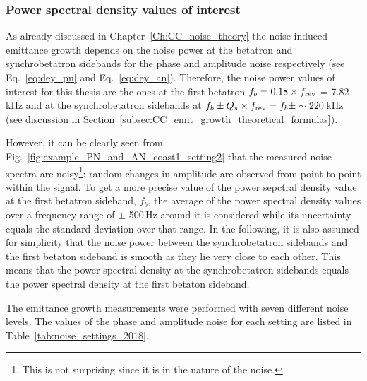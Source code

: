 \subsubsection*{Power spectral density values of interest}
As already discussed in Chapter~\ref{Ch:CC_noise_theory} the noise induced emittance growth depends on the noise power at the betatron and synchrobetatron sidebands for the phase and amplitude noise respectively (see Eq.~\eqref{eq:dey_pn} and Eq.~\eqref{eq:dey_an}). Therefore, the noise power values of interest for this thesis are the ones at the first betatron $f_b = 0.18 \times {f_\mathrm{rev}}$ = 7.82\,kHz and at the synchrobetatron sidebands at $f_b \pm {Q_s} \times {f_\mathrm{rev}}  = f_b \pm  \sim 220$\,kHz (see discussion in Section~\ref{subsec:CC_emit_growth_theoretical_formulas}).


However, it can be clearly seen from Fig.~\ref{fig:example_PN_and_AN_coast1_setting2} that the measured noise spectra are noisy\footnote{This is not surprising since it is in the nature of the noise.}: random changes in amplitude are observed from point to point within the signal. 
To get a more precise value of the power sepctral density value at the first betatron sideband, $f_b$, the average of the power spectral density values over a frequency range of $\pm$ 500\,Hz around it is considered while its uncertainty equals the standard deviation over that range. In the following, it is also assumed for simplicity that the noise power between the synchrobetatron sidebands and the first betaton sideband is smooth as they lie very close to each other. This means that the power spectral density at the synchrobetatron sidebands equals the power spectral density at the first betaton sideband.


The emittance growth measurements were performed with seven different noise levels. The values of the phase and amplitude noise for each setting are listed in Table~\ref{tab:noise_settings_2018}. 

